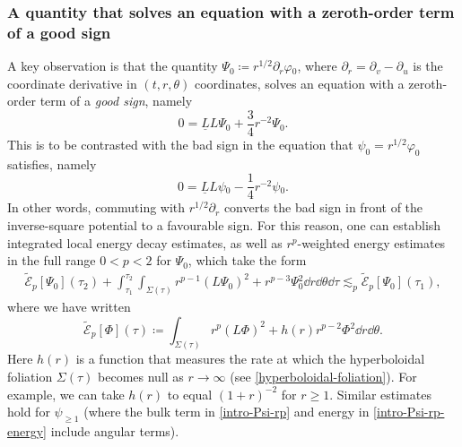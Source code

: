 \documentclass[10pt, reqno]{amsart}
\begin{document}
\subsubsection{A quantity that solves an equation with a zeroth-order term of a good sign}
\label{intro-Psi} A key observation is that the quantity
\(\Psi{}_0\coloneqq{}r^{1/2}\partial_r\varphi{}_0\), where \(\partial_r =
\partial{}_v - \partial{}_u\) is the coordinate derivative in \((t,r,\theta{})\)
coordinates, solves an equation with a zeroth-order term of a \emph{good sign}, namely
\begin{equation}\label{intro-Psi-equation}
0 = \underline{L}L\Psi{}_0 + \frac{3}{4}r^{-2}\Psi{}_0.
\end{equation}
This is to be contrasted with the bad sign in the equation that \(\psi_0 = r^{1/2}\varphi_0\) satisfies, namely
\begin{equation}
0 = \underline{L}L\psi{}_0 - \frac{1}{4}r^{-2}\psi{}_0.
\end{equation}
In other words, commuting with \(r^{1/2}\partial_r\) converts the bad sign in front of
the inverse-square potential to a favourable sign. For this reason, one can
establish integrated local energy decay estimates, as well as \(r^p\)-weighted
energy estimates in the full range \(0<p < 2\) for \(\Psi_0\), which take the
form
\begin{equation}\label{intro-Psi-rp}
\begin{split}
\tilde{\mathcal{E}}_p[\Psi{}_0](\tau{}_2) + \int_{\tau{}_1}^{\tau{}_2} \int _{\Sigma{}(\tau{})} r^{p-1}(L\Psi{}_0)^2 + r^{p-3}\Psi{}_0^2\dd{}r\dd{}\theta{}\dd{}\tau{} \lesssim_p \tilde{\mathcal{E}}_p[\Psi{}_0](\tau{}_1),
\end{split}
\end{equation}
where we have written
\begin{equation}\label{intro-Psi-rp-energy}
\tilde{\mathcal{E}}_p[\Phi{}](\tau{}) \coloneqq{} \int _{\Sigma{}(\tau{})} r^p(L\Phi{})^2 + h(r)r^{p-2}\Phi{}^2\dd{}r\dd{}\theta{}.
\end{equation}
Here \(h(r)\) is a function that measures the rate at which the hyperboloidal
foliation \(\Sigma{}(\tau{})\) becomes null as \(r\to \infty\) (see
\cref{hyperboloidal-foliation}). For example, we can take \(h(r)\) to equal \((1 +
r)^{-2}\) for \(r\ge 1\). Similar estimates hold for \(\psi_{\ge 1}\) (where the
bulk term in \cref{intro-Psi-rp} and energy in \cref{intro-Psi-rp-energy} include
angular terms).
\end{document}
